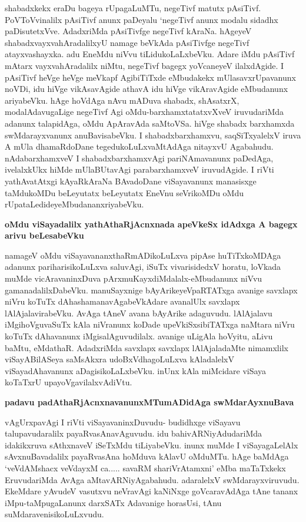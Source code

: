 shabadxkekx eraDu bageya rUpagaLuMTu, negeTivf matutx pAsiTivf. PoVToVvinalilx pAsiTivf anunx paDeyalu `negeTivf anunx modalu sidadhx paDisutetxVve. AdadxriMda pAsiTivfge negeTivf kAraNa. hAgeyeV shabadxvayxvahAradalilxyU namage beVkAda pAsiTivfge negeTivf atayxvashayxka. adu EneMdu niVvu tiLidukoLaLxbeVku. Adare iMdu pAsiTivf mAtarx vayxvahAradalilx niMtu, negeTivf bagegx yoVcaneyeV ilalxdAgide. I pAsiTivf heVge heVge meVkapf AgibiTiTxde eMbudakekx mUlasavxrUpavanunx noVDi, idu hiVge vikAsavAgide athavA idu hiVge vikAravAgide eMbudanunx ariyabeVku. hAge hoVdAga nAvu mADuva shabadx, shAsatxrX, modalAdavugaLige negeTivf Agi oMdu-barxhamxtatatxvXveV iruvudariMda adanunx talapidAga, oMdu ApAravAda saMtoVSa. hiVge shabadx barxhamxda swMdarayxvanunx anuBavisabeVku. I shabadxbarxhamxvu, saqSiTxyalelxV iruva A mUla dhamaRdoDane tegedukoLuLxvaMtAdAga nitayxvU Agabahudu. nAdabarxhamxveV I shabadxbarxhamxvAgi pariNAmavanunx paDedAga, ivelalxkUkx hiMde mUlaBUtavAgi parabarxhamxveV iruvudAgide. I riVti yathAvatAtxgi kAyaRkAraNa BAvadoDane viSayavanunx manasisxge taMdukoMDu beLeyutatx beLeyutatx EneVnu seVrikoMDu oMdu rUpataLedideyeMbudananxriyabeVku.

\noindent
{\bf\large{oMdu viSayadalilx yathAthaRjAcnxnada apeVkeSx idAdxga A bagegx arivu beLesabeVku}}\label{page200}

namageV oMdu viSayavananxthaRmADikoLuLxva pipAse huTiTxkoMDAga adanunx pariharisikoLuLxva saluvAgi, iSuTx vivarisidedxV horatu, loVkada muMde vicAravaninxDuva pArxmuKayxdiMdalalx-eMbudanunx niVvu gamanadalilxDabeVku. manuSayxnige bAyArikeyeVpaRTATxga avanige savxlapx niVru koTuTx dAhashamanavAgabeVkAdare avanalUlx savxlapx lAlAjalavirabeVku. AvAga tAneV avana bAyArike adaguvudu. lAlAjalavu iMgihoVguvaSuTx kAla niVranunx koDade upeVkiSxsibiTATxga naMtara niVru koTuTx dAhavanunx iMgisalAguvudilalx. avanige uLigAla hoVyitu, aLivu baMtu, eMdathaR. AdadxriMda savxlapx savxlapx lAlAjaladaMte nimamxlilx viSayABilASeya saMsAkxra udoBxVdhagoLuLxva kAladalelxV viSayadAhavanunx aDagisikoLaLxbeVku. inUnx kAla miMcidare viSaya koTaTxrU upayoVgavilalxvAdiVtu.

\noindent
{\bf\large{padavu padAthaRjAcnxnavanunxMTumADidAga swMdarAyxnuBava}}\label{page201}

vAgUrxpavAgi I riVti viSayavaninxDuvudu- budidhxge viSayavu talupavudaralilx payaRvasAnavAguvudu. idu bahivARNiyAdudariMda idakikxruva sAthxnaveV iSeTxMdu tiLiyabeVku. inunx muMde I viSayagaLelAlx sAvxnuBavadalilx payaRvasAna hoMduva kAlavU oMduMTu. hAge baMdAga `veVdAMshacx veVdayxM ca..... savaRM shariVrAtamxni' eMba maTaTxkekx EruvudariMda AvAga aMtavARNiyAgabahudu. adaralelxV swMdarayxviruvudu. EkeMdare yAvudeV vasutxvu neVravAgi kaNiNxge goVcaravAdAga tAne tananx iMpu-taMpugaLanunx darxSATx Adavanige horasUsi, tAnu suMdaravenisikoLuLxvudu.

